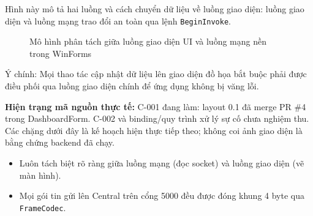 \documentclass[12pt,a4paper]{article}
\begin{document}
Hình này mô tả hai luồng và cách chuyển dữ liệu về luồng giao diện: luồng giao diện và luồng mạng trao đổi an toàn qua lệnh \texttt{BeginInvoke}.

\begin{figure}[H]
  \centering
  \caption{Mô hình phân tách giữa luồng giao diện UI và luồng mạng nền trong WinForms}
  \label{fig:admin_threading_model}
\end{figure}

Ý chính: Mọi thao tác cập nhật dữ liệu lên giao diện đồ họa bắt buộc phải được điều phối qua luồng giao diện chính để ứng dụng không bị văng lỗi.

\begin{importantbox}
\textbf{Hiện trạng mã nguồn thực tế:}
C-001 đang làm: layout 0.1 đã merge PR \#4 trong DashboardForm. C-002 và binding/quy trình xử lý sự cố chưa nghiệm thu. Các chặng dưới đây là kế hoạch hiện thực tiếp theo; không coi ảnh giao diện là bằng chứng backend đã chạy.
\end{importantbox}

\begin{takeawaybox}
\begin{itemize}[leftmargin=1.5em, itemsep=1pt]
  \item Luôn tách biệt rõ ràng giữa luồng mạng (đọc socket) và luồng giao diện (vẽ màn hình).
  \item Mọi gói tin gửi lên Central trên cổng 5000 đều được đóng khung 4 byte qua \texttt{FrameCodec}.
\end{itemize}
\end{takeawaybox}
\end{document}
